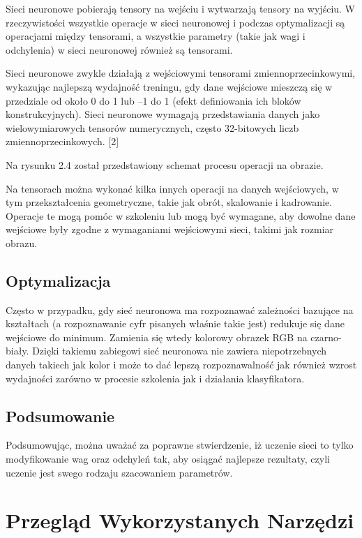 \documentclass[brudnopis]{xmgr}
\begin{document}
Sieci neuronowe pobierają tensory na wejściu i wytwarzają tensory na wyjściu. W rzeczywistości wszystkie operacje w sieci neuronowej i podczas optymalizacji są operacjami między tensorami, a wszystkie parametry (takie jak wagi i odchylenia) w sieci neuronowej również są tensorami.



Sieci neuronowe zwykle działają z wejściowymi tensorami zmiennoprzecinkowymi, wykazując najlepszą wydajność treningu, gdy dane wejściowe mieszczą się w przedziale od około 0 do 1 lub –1 do 1 (efekt definiowania ich bloków konstrukcyjnych). Sieci neuronowe wymagają przedstawiania danych jako wielowymiarowych tensorów numerycznych, często 32-bitowych liczb zmiennoprzecinkowych. [2]

Na rysunku 2.4 został przedstawiony schemat procesu operacji na obrazie.

Na tensorach można  wykonać kilka innych operacji na danych wejściowych, w tym przekształcenia geometryczne, takie jak obrót, skalowanie i kadrowanie. Operacje te mogą pomóc w szkoleniu lub mogą być wymagane, aby dowolne dane wejściowe były zgodne z wymaganiami wejściowymi sieci, takimi jak rozmiar obrazu.

 \section{Optymalizacja \label{s:dsssl}}
 
 Często w przypadku, gdy sieć neuronowa ma rozpoznawać zależności bazujące na kształtach (a rozpoznawanie cyfr pisanych właśnie takie jest) redukuje się dane wejściowe do minimum. Zamienia się wtedy kolorowy obrazek RGB na czarno-biały. Dzięki takiemu zabiegowi sieć neuronowa nie zawiera  niepotrzebnych danych takiech jak kolor i może to dać lepszą rozpoznawalność jak również wzrost wydajności zarówno w procesie szkolenia jak i działania klasyfikatora.  



 \section{Podsumowanie \label{s:dsssl}}
 
Podsumowując, można uważać za  poprawne stwierdzenie, iż uczenie sieci to tylko modyfikowanie wag oraz odchyleń tak, aby osiągać najlepsze rezultaty, czyli uczenie jest swego rodzaju szacowaniem parametrów.   



\chapter{Przegląd Wykorzystanych Narzędzi}
\end{document}
